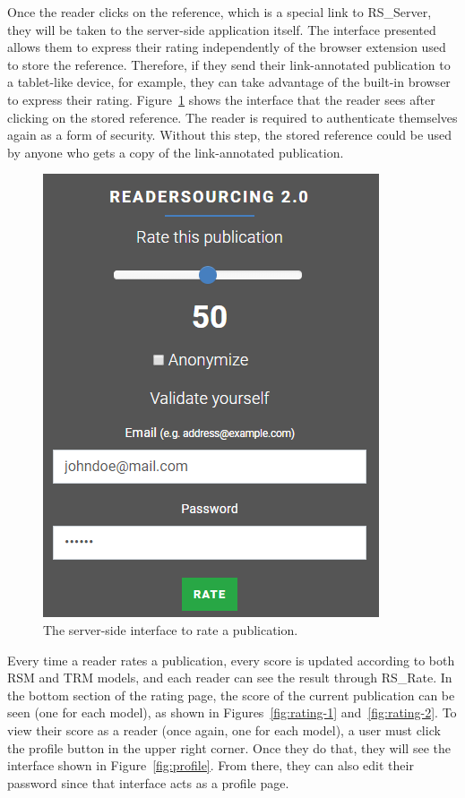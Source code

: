 \documentclass[a4paper, english]{article}
\newcommand{\rsserver}{RS\_Server\xspace}
\newcommand{\rsrate}{RS\_Rate\xspace}
\begin{document}
Once the reader clicks on the reference, which is a special link to \rsserver, they will be taken to the server-side application itself. The interface presented allows them to express their rating independently of the browser extension used to store the reference. Therefore, if they send their link-annotated publication to a tablet-like device, for example, they can take advantage of the built-in browser to express their rating. Figure~\ref{fig:browser} shows the interface that the reader sees after clicking on the stored reference. The reader is required to authenticate themselves again as a form of security. Without this step, the stored reference could be used by anyone who gets a copy of the link-annotated publication.

\begin{figure}
\centering
\includegraphics[scale=0.7]{figures/browser.png}
\caption{The server-side interface to rate a publication.}
\label{fig:browser}
\end{figure}

Every time a reader rates a publication, every score is updated according to both RSM and TRM models, and each reader can see the result through \rsrate. In the bottom section of the rating page, the score of the current publication can be seen (one for each model), as shown in Figures~\ref{fig:rating-1} and~\ref{fig:rating-2}. To view their score as a reader (once again, one for each model), a user must click the profile button in the upper right corner. Once they do that, they will see the interface shown in Figure~\ref{fig:profile}. From there, they can also edit their password since that interface acts as a profile page.
\end{document}
